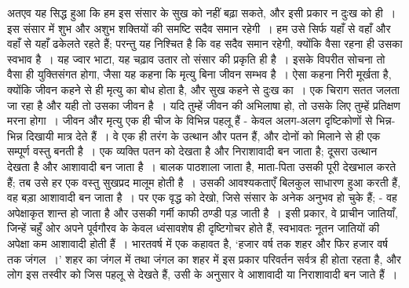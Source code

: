अतएव यह सिद्ध हुआ कि हम इस संसार के सुख को नहीं बढ़ा सकते, और इसी प्रकार न दुःख को ही~। इस संसार में शुभ और अशुभ शक्तियों की समष्टि सदैव समान रहेगी~। हम उसे सिर्फ यहाँ से वहाँ और वहाँ से यहाँ ढकेलते रहते हैं; परन्तु यह निश्चित है कि वह सदैव समान रहेगी, क्योंकि वैसा रहना ही उसका स्वभाव है~। यह ज्वार भाटा, यह चढ़ाव उतार तो संसार की प्रकृति ही है~। इसके विपरीत सोचना तो वैसा ही युक्तिसंगत होगा, जैसा यह कहना कि मृत्यु बिना जीवन सम्भव है~। ऐसा कहना निरी मूर्खता है, क्योंकि जीवन कहने से ही मृत्यु का बोध होता है, और सुख कहने से दुःख का~। एक चिराग सतत जलता जा रहा है और यही तो उसका जीवन है~। यदि तुम्हें जीवन की अभिलाषा हो, तो उसके लिए तुम्हें प्रतिक्षण मरना होगा~। जीवन और मृत्यु एक ही चीज के विभिन्न पहलू हैं - केवल अलग-अलग दृष्टिकोणों से भिन्न-भिन्न दिखायी मात्र देते हैं~। वे एक ही तरंग के उत्थान और पतन हैं, और दोनों को मिलाने से ही एक सम्पूर्ण वस्तु बनती है~। एक व्यक्ति पतन को देखता है और निराशावादी बन जाता है; दूसरा उत्थान देखता है और आशावादी बन जाता है~। बालक पाठशाला जाता है, माता-पिता उसकी पूरी देखभाल करते हैं; तब उसे हर एक वस्तु सुखप्रद मालूम होती है~। उसकी आवश्यकताएँ बिलकुल साधारण हुआ करती हैं, वह बड़ा आशावादी बन जाता है~। पर एक वृद्ध को देखो, जिसे संसार के अनेक अनुभव हो चुके हैं; - वह अपेक्षाकृत शान्त हो जाता है और उसकी गर्मी काफी ठण्डी पड़ जाती है~। इसी प्रकार, वे प्राचीन जातियाँ, जिन्हें चहुँ ओर अपने पूर्वगौरव के केवल ध्वंसावशेष ही दृष्टिगोचर होते हैं, स्वभावतः नूतन जातियों की अपेक्षा कम आशावादी होती हैं~। भारतवर्ष में एक कहावत है, ‘हजार वर्ष तक शहर और फिर हजार वर्ष तक जंगल~।’ शहर का जंगल में तथा जंगल का शहर में इस प्रकार परिवर्तन सर्वत्र ही होता रहता है, और लोग इस तस्वीर को जिस पहलू से देखते हैं, उसी के अनुसार वे आशावादी या निराशावादी बन जाते हैं~।

